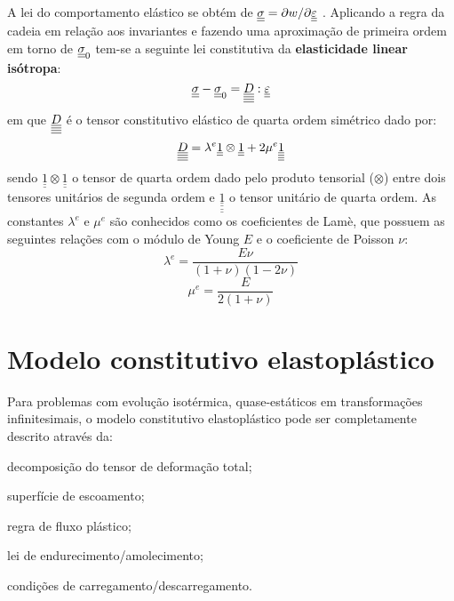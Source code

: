 A lei do comportamento elástico se obtém de $\underline{\underline \sigma} = \partial w / \partial \underline{\underline \varepsilon}$ . Aplicando a regra da cadeia em relação aos invariantes e fazendo uma aproximação de primeira ordem em torno de $\underline{\underline \sigma}_0$ tem-se a seguinte lei constitutiva da \textbf{elasticidade linear isótropa}:
\begin{equation}
	\label{eq:lei_elasticidade}
	\underline{\underline \sigma} - \underline{\underline \sigma}_0 = \underline{\underline{\underline{\underline D}}}:\underline{\underline \varepsilon}
\end{equation}
em que $\underline{\underline{\underline{\underline D}}}$ é o tensor constitutivo elástico de quarta ordem simétrico dado por:
\begin{equation}
	\label{eq:tensor_constitutivo_elastico}
 	\underline{\underline{\underline{\underline D}}} = \lambda^e \underline{\underline 1} \otimes \underline{\underline 1} + 2 \mu^e \underline{\underline{\underline{\underline 1}}}
\end{equation}
sendo $\underline{\underline 1} \otimes \underline{\underline 1}$ o tensor de quarta ordem dado pelo produto tensorial ($\otimes$) entre dois tensores unitários de segunda ordem e $\underline{\underline{\underline{\underline 1}}}$ o tensor unitário de quarta ordem. As constantes $\lambda^e$ e $\mu^e$ são conhecidos como os coeficientes de Lamè, que possuem as seguintes relações com o módulo de Young $E$ e o coeficiente de Poisson $\nu$:
\begin{equation}
	\label{eq:lambdae}
	\lambda^e = \frac{E \nu}{(1+\nu)(1-2\nu)}
\end{equation}
\begin{equation}
	\label{eq:mue}
	\mu^e = \frac{E}{2(1+\nu)}
\end{equation}

\section{Modelo constitutivo elastoplástico}

Para problemas com evolução isotérmica, quase-estáticos em transformações infinitesimais, o modelo constitutivo elastoplástico pode ser completamente descrito através da:
\begin{alineas}
	\item decomposição do tensor de deformação total;
	\item superfície de escoamento;
	\item regra de fluxo plástico;
	\item lei de endurecimento/amolecimento;
	\item condições de carregamento/descarregamento.
\end{alineas}


